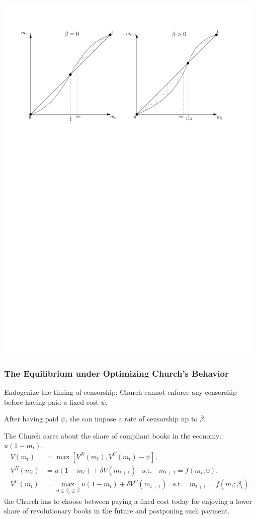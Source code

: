 \documentclass[usepdftitle=false,aspectratio=169,xcolor=dvipsnames]{beamer}
\begin{document}
	\begin{frame}

\includegraphics[width=13cm]{dynamics-m.pdf}
\end{frame}


	\begin{frame}
\frametitle{The Equilibrium under  Optimizing Church's Behavior}

Endogenize the timing of censorship: Church cannot enforce any censorship before having paid a fixed cost $\psi$.

  After having paid $\psi$, she can impose a rate of censorship up to $\overline{\beta}$.

   The Church cares about the share of compliant books in the economy:  $u(1-m_t)$.
\begin{align*}	
	V(m_{t})&=\max[V^N(m_{t}),V^C(m_{t})-\psi],\\
V^{N}(m_{t})&=u(1-m_{t})+\delta V(m_{t+1})	\;\;\;
	 \text{s.t.}\quad m_{t+1}=f(m_{t};0),\\
V^{C}(m_{t})&=\max_{0\leq\beta_t\leq\overline{\beta}}u(1-m_{t})+\delta V^C(m_{t+1})\;\;\;	
	 \text{s.t.}\quad m_{t+1}=f(m_{t};\beta_t).
\end{align*}
the Church has to choose between paying a fixed cost today for enjoying a lower share of revolutionary books in the future and postponing such payment.

\end{frame}
\end{document}
